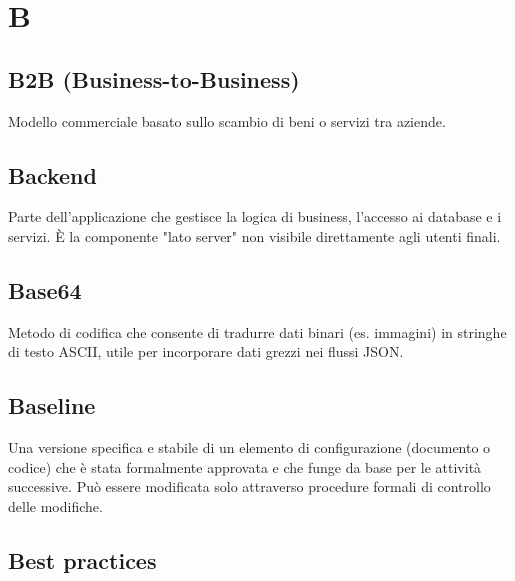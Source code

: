 \documentclass[a4paper, 11pt, oneside]{scrartcl} %
\begin{document}
\vspace{0.5cm}



\section*{B}


\subsection*{B2B (Business-to-Business)}
Modello commerciale basato sullo scambio di beni o servizi tra aziende.
\vspace{0.5cm}

\subsection*{Backend}


Parte dell'applicazione che gestisce la logica di business, l'accesso ai database e i servizi. È la componente "lato server" non visibile direttamente agli utenti finali.

\vspace{0.5cm}

\subsection*{Base64}
Metodo di codifica che consente di tradurre dati binari (es. immagini) in stringhe di testo ASCII, utile per incorporare dati grezzi nei flussi JSON.
\vspace{0.5cm}

\subsection*{Baseline}
Una versione specifica e stabile di un elemento di configurazione (documento o codice) che è stata formalmente approvata e che funge da base per le attività successive. Può essere modificata solo attraverso procedure formali di controllo delle modifiche.
\vspace{0.5cm}

\subsection*{Best practices}
\end{document}
